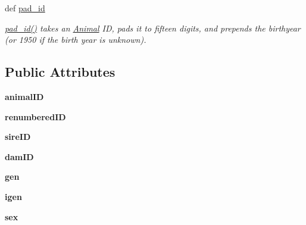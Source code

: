 \begin{DoxyCompactItemize}
def \hyperlink{classPyPedal_1_1pyp__classes_1_1Animal_a41d6af83aa24c442fd52005cb45bd2fd}{pad\_\-id}
\begin{DoxyCompactList}\small\item\em \hyperlink{classPyPedal_1_1pyp__classes_1_1Animal_a41d6af83aa24c442fd52005cb45bd2fd}{pad\_\-id()} takes an \hyperlink{classPyPedal_1_1pyp__classes_1_1Animal}{Animal} ID, pads it to fifteen digits, and prepends the birthyear (or 1950 if the birth year is unknown). \item\end{DoxyCompactList}\end{DoxyCompactItemize}
\subsection*{Public Attributes}
\begin{DoxyCompactItemize}
\item 
\hypertarget{classPyPedal_1_1pyp__classes_1_1Animal_af3c47a21dec355f9405c93359a37fec1}{
{\bfseries animalID}}
\label{classPyPedal_1_1pyp__classes_1_1Animal_af3c47a21dec355f9405c93359a37fec1}

\item 
\hypertarget{classPyPedal_1_1pyp__classes_1_1Animal_a0e137bcbc54b68f5b6f0920403f38814}{
{\bfseries renumberedID}}
\label{classPyPedal_1_1pyp__classes_1_1Animal_a0e137bcbc54b68f5b6f0920403f38814}

\item 
\hypertarget{classPyPedal_1_1pyp__classes_1_1Animal_aef796dbb26d7acc517f0ffbc94df8092}{
{\bfseries sireID}}
\label{classPyPedal_1_1pyp__classes_1_1Animal_aef796dbb26d7acc517f0ffbc94df8092}

\item 
\hypertarget{classPyPedal_1_1pyp__classes_1_1Animal_add71673631742a11ee4895794854cd09}{
{\bfseries damID}}
\label{classPyPedal_1_1pyp__classes_1_1Animal_add71673631742a11ee4895794854cd09}

\item 
\hypertarget{classPyPedal_1_1pyp__classes_1_1Animal_a3c029982424d41a6d2f1d29cbec67819}{
{\bfseries gen}}
\label{classPyPedal_1_1pyp__classes_1_1Animal_a3c029982424d41a6d2f1d29cbec67819}

\item 
\hypertarget{classPyPedal_1_1pyp__classes_1_1Animal_a7dd147bc9786519e4d3b0c51ede43ed2}{
{\bfseries igen}}
\label{classPyPedal_1_1pyp__classes_1_1Animal_a7dd147bc9786519e4d3b0c51ede43ed2}

\item 
\hypertarget{classPyPedal_1_1pyp__classes_1_1Animal_a42ef2c619bf60ea9b6c1dfe74554a4f4}{
{\bfseries sex}}
\label{classPyPedal_1_1pyp__classes_1_1Animal_a42ef2c619bf60ea9b6c1dfe74554a4f4}


\end{DoxyCompactItemize}
